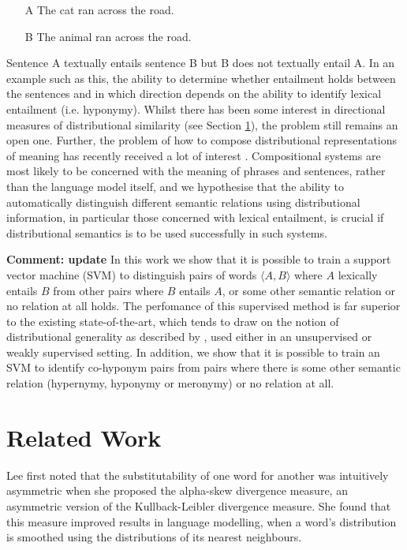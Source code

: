 \documentclass[11pt]{article}
\begin{document}
\begin{itemize}
\item[A]{The cat ran across the road.}
\item[B]{The animal ran across the road.}
\end{itemize}

Sentence A textually entails sentence B but B does not textually entail A. In an example such as this, the ability to determine whether entailment holds between the sentences and in which direction depends on the ability to identify lexical entailment (i.e. hyponymy). Whilst there has been some interest in directional measures of distributional similarity (see Section \ref{sect:relwork}), the problem still remains an open one.  Further, the problem of how to compose distributional representations of meaning has recently received a lot of interest \cite{Widdows:08,Mitchell:08,Baroni2010,Grefenstette:11,Socher:12}.  Compositional systems are most likely to be concerned with the meaning of phrases and sentences, rather than the language model itself, and we hypothesise that the ability to automatically distinguish different semantic relations using distributional information, in particular those concerned with lexical entailment, is crucial if distributional semantics is to be used successfully in such systems.

{\bf Comment: update} In this work we show that it is possible to train a support vector machine (SVM) to distinguish pairs of words $\langle A,B\rangle$ where $A$ lexically entails $B$ from other pairs where $B$ entails $A$, or some other semantic relation or no relation at all holds.  The perfomance of this supervised method is far superior to the existing state-of-the-art, which tends to draw on the notion of distributional generality as described by \cite{Weeds2004}, used either in an unsupervised or weakly supervised setting.  In addition, we show that it is possible to train an SVM to identify co-hyponym pairs from pairs where there is some other semantic relation (hypernymy, hyponymy or meronymy) or no relation at all. 

\section{Related Work}
\label{sect:relwork}

Lee  first noted that the substitutability of one word for another was intuitively asymmetric when she proposed the alpha-skew divergence measure, an asymmetric version of the Kullback-Leibler divergence measure.  She found that this measure improved results in language modelling, when a word's distribution is smoothed using the distributions of its nearest neighbours.
\end{document}

